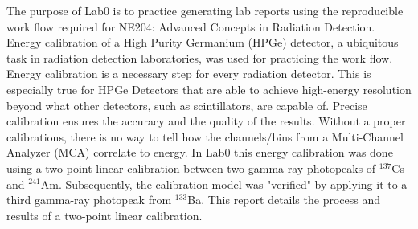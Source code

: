 The purpose of Lab0 is to practice generating lab reports using the reproducible work flow required for NE204: Advanced Concepts in Radiation Detection. Energy calibration of a High Purity Germanium (HPGe) detector, a ubiquitous task in radiation detection laboratories, was used for practicing the work flow. Energy calibration is a necessary step for every radiation detector. This is especially true for HPGe Detectors that are able to achieve high-energy resolution beyond what other detectors, such as scintillators, are capable of. Precise calibration ensures the accuracy and the quality of the results. Without a proper calibrations, there is no way to tell how the channels/bins from a Multi-Channel Analyzer (MCA) correlate to energy. In Lab0 this energy calibration was done using a two-point linear calibration between two gamma-ray photopeaks of $^{137}$Cs and $^{241}$Am. Subsequently, the calibration model was "verified" by applying it to a third gamma-ray photopeak from $^{133}$Ba. This report details the process and results of a two-point linear calibration.

